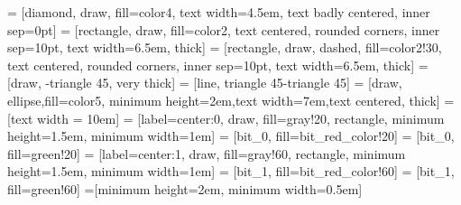 \usetikzlibrary{shapes,arrows,fit,positioning, decorations, chains, decorations.markings}




 = [diamond, draw, fill=color4, 
    text width=4.5em, text badly centered, inner sep=0pt]
 = [rectangle, draw, fill=color2, text centered, rounded corners, inner sep=10pt,
                     text width=6.5em, thick]
 = [rectangle, draw, dashed, fill=color2!30, text centered, rounded corners, inner sep=10pt,
                     text width=6.5em, thick]
 = [draw, -triangle 45, very thick]
 = [line, triangle 45-triangle 45]
 = [draw, ellipse,fill=color5, minimum height=2em,text width=7em,text centered, thick]
 = [text width = 10em]
 = [label={center:0}, draw, fill=gray!20, rectangle, minimum height=1.5em, minimum width=1em]
 = [bit_0, fill=bit_red_color!20]
 = [bit_0, fill=green!20]
 = [label={center:1}, draw, fill=gray!60, rectangle, minimum height=1.5em, minimum width=1em]
 = [bit_1, fill=bit_red_color!60]
 = [bit_1, fill=green!60]
=[minimum height=2em, minimum width=0.5em]

\newenvironment{customlegend}[1][]{%
    \begingroup
    \csname pgfplots@init@cleared@structures\endcsname
    \pgfplotsset{#1}%
}{%
    \csname pgfplots@createlegend\endcsname
    \endgroup
}%

\def\addlegendimage{\csname pgfplots@addlegendimage\endcsname}

\usepackage{pgfplots}
\pgfplotsset{compat=1.9} %